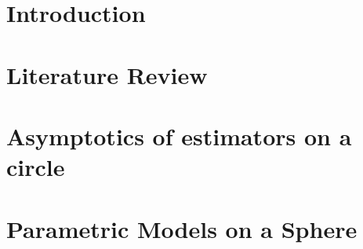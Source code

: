 \documentclass[phd]{uncgdissertation}
\begin{document}
\tableofcontents %


\listoftables   


\listoffigures   


\mainmatter %


\chapter{Introduction}


\chapter{Literature Review}



\chapter{Asymptotics of estimators on a circle}


\chapter{Parametric Models on a Sphere}


\end{document}
